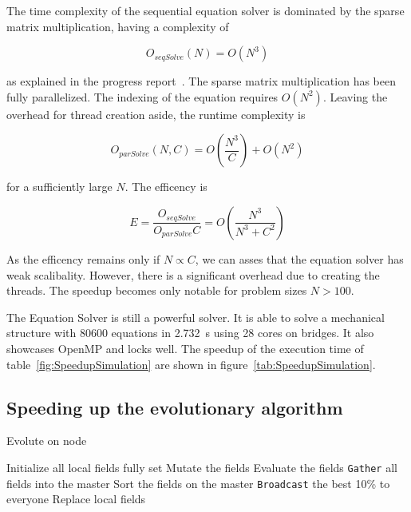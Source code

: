 \documentclass[12pt]{article}
\begin{document}
The time complexity of the sequential equation solver is dominated by the sparse matrix multiplication, having a complexity of 

\begin{equation}
    O_\mathit{seqSolve}(N) = O(N^3) 
\end{equation}

as explained in the progress report~\cite{ProgressReport}. The sparse matrix multiplication has been fully parallelized. The indexing of the equation requires $O(N^2)$. Leaving the overhead for thread creation aside, the runtime complexity is 

\begin{equation}
    O_\mathit{parSolve}(N, C) = O \left(\frac{N^3}{C}\right) + O(N^2)
\end{equation}

for a sufficiently large $N$. The efficency is

\begin{equation}
    E = \frac{O_\mathit{seqSolve}}{O_\mathit{parSolve} C} = O\left(\frac{N^3}{N^3 + C^2}\right)
\end{equation}

As the efficency remains only if $N \propto C$, we can asses that the equation solver has weak scalibality. However, there is a significant overhead due to creating the threads. The speedup becomes only notable for problem sizes $N > 100$.

The Equation Solver is still a powerful solver. It is able to solve a mechanical structure with 80600 equations in \SI{2.732}{\second} using 28 cores on bridges. It also showcases OpenMP and locks well. The speedup of the execution time of table~\ref{fig:SpeedupSimulation} are shown in figure~\ref{tab:SpeedupSimulation}.

\subsection{Speeding up the evolutionary algorithm}

\begin{algorithm}[p]
    \caption{Evolute on node}
    \begin{algorithmic}
        \STATE Initialize all local fields fully set
            \STATE Mutate the fields
            \STATE Evaluate the fields
            \STATE \texttt{Gather} all fields into the master
            \STATE Sort the fields on the master
            \STATE \texttt{Broadcast} the best 10\% to everyone
            \STATE Replace local fields
        \ENDFOR
    \end{algorithmic}
    \label{alg:Evolution}
\end{algorithm}
\end{document}
